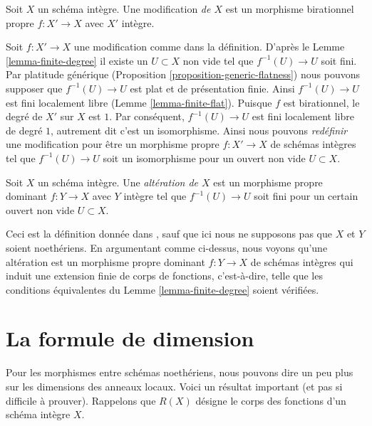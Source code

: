 \begin{definition}
\label{definition-modification}
Soit $X$ un schéma intègre. Une modification {\it de $X$}
est un morphisme birationnel propre $f : X' \to X$ avec $X'$
intègre.
\end{definition}

\noindent
Soit $f : X' \to X$ une modification comme dans la définition. D'après
le Lemme \ref{lemma-finite-degree} il existe un $U \subset X$ non vide tel que $f^{-1}(U) \to U$ soit
fini. Par platitude générique (Proposition \ref{proposition-generic-flatness})
nous pouvons supposer que $f^{-1}(U) \to U$ est plat et
de présentation finie. Ainsi $f^{-1}(U) \to U$ est fini localement libre (Lemme
\ref{lemma-finite-flat}). Puisque $f$ est birationnel, le degré de $X'$ sur
$X$ est $1$. Par conséquent, $f^{-1}(U) \to U$ est fini
localement libre de degré $1$, autrement dit c'est un isomorphisme.
Ainsi nous pouvons {\it redéfinir}
une modification pour être un morphisme propre $f : X' \to X$ de schémas
intègres tel que $f^{-1}(U) \to U$ soit un isomorphisme pour un ouvert non vide
$U \subset X$.

\begin{definition}
\label{definition-alteration}
\begin{reference}
\cite[Définition 2.20]{alterations}
\end{reference}
Soit $X$ un schéma intègre. Une {\it altération
de $X$} est un morphisme propre dominant $f : Y \to X$ avec $Y$
intègre tel que $f^{-1}(U) \to U$ soit fini pour un certain ouvert non vide $U \subset X$.
\end{definition}

\noindent
Ceci est la définition donnée dans \cite{alterations}, sauf que ici nous ne supposons
pas que $X$ et $Y$ soient noethériens. En argumentant comme
ci-dessus, nous voyons qu'une altération est un morphisme propre dominant $f : Y \to X$
de schémas intègres qui induit une extension finie de
corps de fonctions, c’est-à-dire, telle que les conditions équivalentes
du Lemme \ref{lemma-finite-degree} soient vérifiées.



\section{La formule de dimension}
\label{section-dimension-formula}

\noindent
Pour les morphismes entre schémas noethériens, nous pouvons dire un peu plus
sur les dimensions des anneaux locaux. Voici un résultat important (et pas si
difficile à prouver). Rappelons que $R(X)$ désigne le corps des fonctions d'un
schéma intègre $X$.

